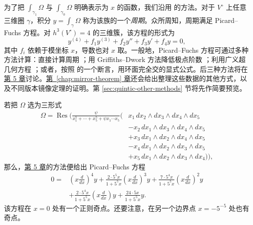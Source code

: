 为了把 $\int_{\gamma_1}\Omega$ 与 $\int_{\gamma_0}\Omega$ 明确表示为 $x$ 的函数，我们沿用  的方法。对于 $V^\circ$ 上任意三维圈 $\gamma$，积分 $y=\int_\gamma\Omega$ 称为该族的一个\emph{周期}。众所周知，周期满足 Picard--Fuchs 方程。对 $h^3(V^\circ)=4$ 的三维簇，该方程的形式为
\[
y^{(4)}+f_1y^{(3)}+f_2y''+f_3y'+f_4y=0,
\]
其中 $f_i$ 依赖于模坐标 $x$，导数也对 $x$ 取。一般地，Picard--Fuchs 方程可通过多种方法计算：直接计算周期 ；用 Griffiths--Dwork 方法降低极点阶数 ；利用广义超几何方程 ；或者，按照  的一个断言，用环面完全交的显式公式。后三种方法将在\hyperref[chap:hodge-yukawa]{第 5 章}讨论。\hyperref[chap:mirror-theorem]{第~\ref*{chap:mirror-theorem} 章}还会给出整理这些数据的其他方式，以及不同版本镜像定理的证明。第 \ref{sec:quintic-other-methods} 节将先作简要预览。

若把 $\Omega$ 选为三形式
\begin{equation}\label{eq:quintic-residue}
\begin{aligned}
\Omega=\operatorname{Res}\Bigg(\frac{\psi}{x_1^5+\cdots+x_5^5+\psi x_1\cdots x_5}
\Big(&x_1\,dx_2\wedge dx_3\wedge dx_4\wedge dx_5\\
&-x_2\,dx_1\wedge dx_3\wedge dx_4\wedge dx_5\\
&+x_3\,dx_1\wedge dx_2\wedge dx_4\wedge dx_5\\
&-x_4\,dx_1\wedge dx_2\wedge dx_3\wedge dx_5\\
&+x_5\,dx_1\wedge dx_2\wedge dx_3\wedge dx_4\Big)\Bigg),
\end{aligned}
\end{equation}
那么，\hyperref[chap:hodge-yukawa]{第 5 章}的方法便给出 Picard--Fuchs 方程
\begin{equation}\label{eq:quintic-pf}
\begin{aligned}
0={}&\left(x\frac{d}{dx}\right)^4y
+\frac{2\cdot5^5x}{1+5^5x}\left(x\frac{d}{dx}\right)^3y
+\frac{7\cdot5^4x}{1+5^5x}\left(x\frac{d}{dx}\right)^2y\\
&+\frac{2\cdot5^4x}{1+5^5x}\left(x\frac{d}{dx}\right)y
+\frac{24\cdot5x}{1+5^5x}y.
\end{aligned}
\end{equation}
该方程在 $x=0$ 处有一个正则奇点。还要注意，在另一个边界点 $x=-5^{-5}$ 处也有奇点。

